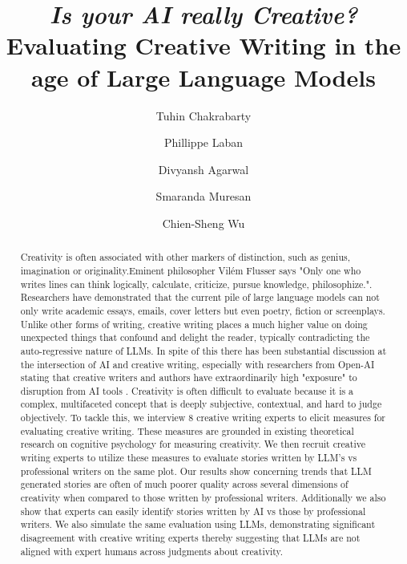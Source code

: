 \documentclass[manuscript,screen,review]{acmart}
\begin{document}
\title{\textit{Is your AI really Creative?} Evaluating Creative Writing in the age of Large Language Models}


\author{Tuhin Chakrabarty}

\author{Phillippe Laban}

\author{Divyansh Agarwal}

\author{Smaranda Muresan}

\author{Chien-Sheng Wu}



\begin{abstract}
Creativity is often associated with other markers of distinction, such as genius, imagination or originality.Eminent philosopher Vilém Flusser says "Only one who writes lines can think logically, calculate, criticize, pursue knowledge, philosophize.". Researchers have demonstrated that the current pile of large language models can  not only write academic essays, emails, cover letters but even poetry, fiction or screenplays. Unlike other forms of writing, creative writing places a much higher value on doing unexpected things that confound and delight the reader, typically contradicting the auto-regressive nature of LLMs. In spite of this there has been substantial discussion at the intersection of AI and creative writing, especially with researchers from Open-AI stating that creative writers and authors have extraordinarily high "exposure" to disruption from AI tools \cite{eloundou2023gpts}. Creativity is often difficult to evaluate because it is a complex, multifaceted concept that is deeply subjective, contextual, and hard to judge objectively. To tackle this, we interview 8 creative writing experts to elicit measures for evaluating creative writing. These measures are grounded in existing theoretical research on cognitive psychology for measuring creativity. We then recruit creative writing experts to utilize these measures to evaluate stories written by LLM's vs professional writers on the same plot. Our results show concerning trends that LLM generated stories are often of much poorer quality across several dimensions of creativity when compared to those written by professional writers. Additionally we also show that experts can easily identify stories written by AI vs those by professional writers. We also simulate the same evaluation using LLMs, demonstrating significant disagreement with creative writing experts thereby suggesting that LLMs are not aligned with expert humans across judgments about creativity.
\end{abstract}
\end{document}
